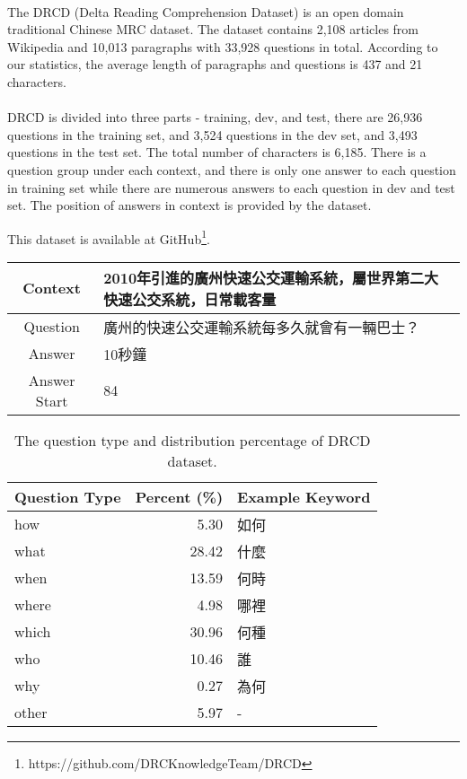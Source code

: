 \documentclass{article}
\begin{document}
\paragraph{}
The DRCD\cite{shao2018drcd} (Delta Reading Comprehension Dataset) is an open domain traditional Chinese MRC dataset. The dataset contains 2,108 articles from Wikipedia and 10,013 paragraphs with 33,928 questions in total. According to our statistics, the average length of paragraphs and questions is 437 and 21 characters.

\paragraph{}
DRCD is divided into three parts - training, dev, and test, there are 26,936 questions in the training set, and 3,524 questions in the dev set, and 3,493 questions in the test set. The total number of characters is 6,185. There is a question group under each context, and there is only one answer to each question in training set while there are numerous answers to each question in dev and test set. The position of answers in context is provided by the dataset.

This dataset is available at GitHub\footnote{\label{drcd_github}https://github.com/DRCKnowledgeTeam/DRCD}.

\begin{CJK*}{UTF8}{bsmi}
  \begin{table}[ht!]
    \centering
    \begin{tabular}{|c|l|}
    \hline
    Context & 2010年引進的廣州快速公交運輸系統，屬世界第二大快速公交系統，日常載客量 \\ \hline
    Question & 廣州的快速公交運輸系統每多久就會有一輛巴士？ \\ \hline
    Answer & 10秒鐘 \\ \hline
    Answer Start & 84 \\ \hline
    \end{tabular}
  \end{table}

  \begin{table}[ht!]
    \centering
    \begin{tabular}{|l|r|l|}
      \hline
      \multicolumn{1}{|c|}{Question Type} & \multicolumn{1}{c|}{Percent (\%)} & \multicolumn{1}{c|}{Example Keyword} \\ \hline
      how & 5.30 & 如何 \\ \hline
      what & 28.42 & 什麼 \\ \hline
      when & 13.59 & 何時 \\ \hline
      where & 4.98 & 哪裡 \\ \hline
      which & 30.96 & 何種 \\ \hline
      who & 10.46 & 誰 \\ \hline
      why & 0.27 & 為何 \\ \hline
      other & 5.97 & - \\ \hline
    \end{tabular}
    \caption{The question type and distribution percentage of DRCD dataset.}
  \end{table}
\end{CJK*}
\end{document}

